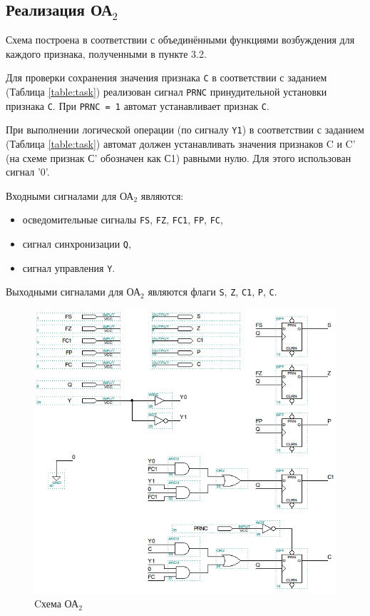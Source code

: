 \clearpage
\subsection{Реализация ОА${}_2$}

Схема построена в соответствии с объединёнными функциями возбуждения для каждого признака, полученными в пункте 3.2.

Для проверки сохранения значения признака \texttt{C} в соответствии с заданием (Таблица \ref{table:task}) реализован сигнал \texttt{PRNC} принудительной установки признака \texttt{С}. При \texttt{PRNC = 1} автомат устанавливает признак \texttt{C}.

При выполнении логической операции (по сигналу \texttt{Y1}) в соответствии с заданием (Таблица \ref{table:task}) автомат должен устанавливать значения признаков C и C' (на схеме признак С' обозначен как С1) равными нулю. Для этого использован сигнал '0'.

Входными сигналами для ОА${}_2$ являются:
\begin{itemize}
	\item осведомительные сигналы \texttt{FS}, \texttt{FZ}, \texttt{FC1}, \texttt{FP}, \texttt{FC},
	\item сигнал синхронизации \texttt{Q},
	\item сигнал управления \texttt{Y}.
\end{itemize}

Выходными сигналами для ОА${}_2$ являются флаги \texttt{S}, \texttt{Z}, \texttt{C1}, \texttt{P}, \texttt{C}.

\begin{figure}[H]
	\includegraphics[scale=0.6]{images/altera/rev2/OA2_PRNC/OA2_PRNC_WIDE.png}
	\caption{Cхема ОА$_{2}$}
	\label{figure:oa2log}
\end{figure}

